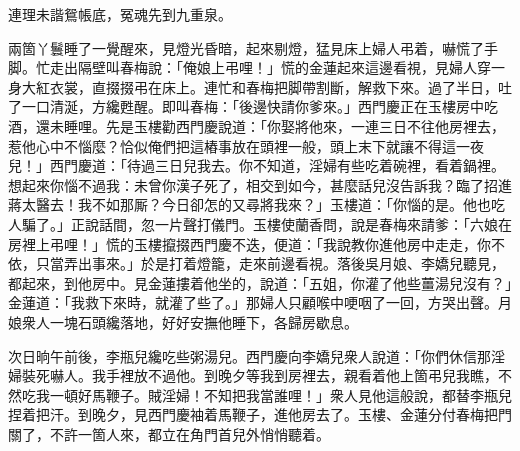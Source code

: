 \begin{myquote} 
連理未諧鴛帳底，冤魂先到九重泉。
\end{myquote} 

兩箇丫鬟睡了一覺醒來，見燈光昏暗，起來剔燈，猛見床上婦人弔着，嚇慌了手脚。忙走出隔壁叫春梅說：「俺娘上弔哩！」慌的金蓮起來這邊看視，見婦人穿一身大紅衣裳，直掇掇弔在床上。連忙和春梅把脚帶割斷，解救下來。過了半日，吐了一口清涎，方纔甦醒。即叫春梅：「後邊快請你爹來。」西門慶正在玉樓房中吃酒，還未睡哩。先是玉樓勸西門慶說道：「你娶將他來，一連三日不往他房裡去，惹他心中不惱麼？恰似俺們把這樁事放在頭裡一般，頭上末下就讓不得這一夜兒！」西門慶道：「待過三日兒我去。你不知道，淫婦有些吃着碗裡，看着鍋裡。想起來你惱不過我：未曾你漢子死了，相交到如今，甚麼話兒沒告訴我？臨了招進蔣太醫去！我不如那厮？今日卻怎的又尋將我來？」玉樓道：「你惱的是。他也吃人騙了。」正說話間，忽一片聲打儀門。玉樓使蘭香問，說是春梅來請爹：「六娘在房裡上弔哩！」慌的玉樓攛掇西門慶不迭，便道：「我說教你進他房中走走，你不依，只當弄出事來。」於是打着燈籠，走來前邊看視。落後吳月娘、李嬌兒聽見，都起來，到他房中。見金蓮摟着他坐的，說道：「五姐，你灌了他些薑湯兒沒有？」金蓮道：「我救下來時，就灌了些了。」那婦人只顧喉中哽咽了一回，方哭出聲。月娘衆人一塊石頭纔落地，好好安撫他睡下，各歸房歇息。

次日晌午前後，李瓶兒纔吃些粥湯兒。西門慶向李嬌兒衆人說道：「你們休信那淫婦裝死嚇人。我手裡放不過他。到晚夕等我到房裡去，親看着他上箇弔兒我瞧，不然吃我一頓好馬鞭子。賊淫婦！不知把我當誰哩！」衆人見他這般說，都替李瓶兒捏着把汗。到晚夕，見西門慶袖着馬鞭子，進他房去了。玉樓、金蓮分付春梅把門關了，不許一箇人來，都立在角門首兒外悄悄聽着。

